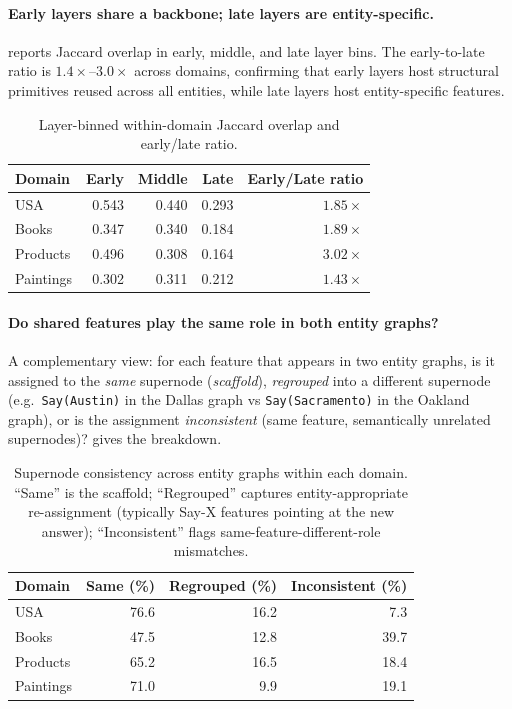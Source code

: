 \paragraph{Early layers share a backbone; late layers are entity-specific.}
 reports Jaccard overlap in early, middle, and late layer bins. The early-to-late ratio is $1.4\times$--$3.0\times$ across domains, confirming that early layers host structural primitives reused across all entities, while late layers host entity-specific features.

\begin{table}[h]
\centering\small
\begin{tabular}{lrrrr}
\toprule
Domain & Early & Middle & Late & Early/Late ratio \\
\midrule
USA       & 0.543 & 0.440 & 0.293 & $1.85\times$ \\
Books     & 0.347 & 0.340 & 0.184 & $1.89\times$ \\
Products  & 0.496 & 0.308 & 0.164 & $3.02\times$ \\
Paintings & 0.302 & 0.311 & 0.212 & $1.43\times$ \\
\bottomrule
\end{tabular}
\caption{Layer-binned within-domain Jaccard overlap and early/late ratio.}
\label{tab:layer-jaccard}
\end{table}

\paragraph{Do shared features play the same role in both entity graphs?}
A complementary view: for each feature that appears in two entity graphs, is it assigned to the \emph{same} supernode (\emph{scaffold}), \emph{regrouped} into a different supernode (e.g.\ \texttt{Say(Austin)} in the Dallas graph vs \texttt{Say(Sacramento)} in the Oakland graph), or is the assignment \emph{inconsistent} (same feature, semantically unrelated supernodes)?  gives the breakdown.

\begin{table}[h]
\centering\small
\begin{tabular}{lrrr}
\toprule
Domain    & Same (\%) & Regrouped (\%) & Inconsistent (\%) \\
\midrule
USA       & 76.6 & 16.2 &  7.3 \\
Books     & 47.5 & 12.8 & 39.7 \\
Products  & 65.2 & 16.5 & 18.4 \\
Paintings & 71.0 &  9.9 & 19.1 \\
\bottomrule
\end{tabular}
\caption{Supernode consistency across entity graphs within each domain. ``Same'' is the scaffold; ``Regrouped'' captures entity-appropriate re-assignment (typically Say-X features pointing at the new answer); ``Inconsistent'' flags same-feature-different-role mismatches.}
\label{tab:supernode-consistency}
\end{table}

